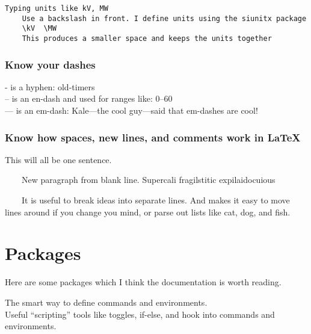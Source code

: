 \documentclass{\FormatDir corpboreportMulti}
\newcommand{\llcmd}[1]{\leavevmode\llap{\texttt{\detokenize{#1}\ }}}
\newcommand{\llcmdlink}[2]{\href{#2}{\hspace{-15ex}}\hspace{15ex}\llcmd{#1}}%
\begin{document}
\begin{lstlisting}



Typing units like kV, MW
	Use a backslash in front. I define units using the siunitx package
	\kV  \MW
	This produces a smaller space and keeps the units together
\end{lstlisting}


\subsubsection{Know your dashes}
\begin{LTXexample}
- is a hyphen: old-timers\\
-- is an en-dash and used for ranges like: 0--60\\
--- is an em-dash: Kale---the cool guy---said that
       em-dashes are cool!
\end{LTXexample}



\subsubsection{Know how spaces, new lines, and comments work in LaTeX}
\begin{LTXexample}
This will all
be one sentence.

\ \ \ \ New paragraph from blank line.
Supercali%
fragilstitic%
expilaidocuious  %

\ \ \ \ It is useful to break ideas
into separate lines.
And makes it easy to
move lines around
if you change you mind, or
parse out lists like
cat,
dog, and
fish.
\end{LTXexample}




\section{Packages}

Here are some packages which I think the documentation is worth reading.

\llcmd{V links V}


\llcmdlink{xparse}{https://muug.ca/mirror/ctan/macros/latex/contrib/l3packages/xparse.pdf}The smart way to define commands and environments.\\
\llcmdlink{etoolbox}{http://mirrors.ctan.org/macros/latex/contrib/etoolbox/etoolbox.pdf}Useful ``scripting'' tools like toggles, if-else, and hook into commands and environments.\\
\end{document}
